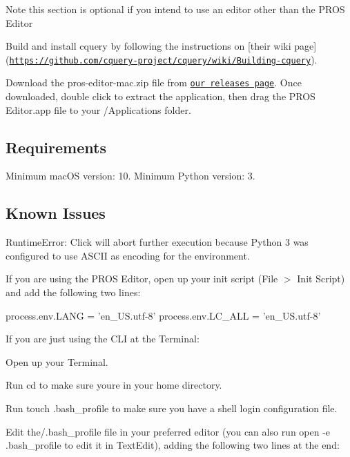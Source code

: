 \begin{DoxyNote}{Note}
this section is optional if you intend to use an editor other than the P\+R\+OS Editor
\end{DoxyNote}

\begin{DoxyEnumerate}
\item Build and install cquery by following the instructions on \mbox{[}their wiki page\mbox{]}(\href{https://github.com/cquery-project/cquery/wiki/Building-cquery}{\tt https\+://github.\+com/cquery-\/project/cquery/wiki/\+Building-\/cquery}).
\item Download the pros-\/editor-\/mac.\+zip file from \href{https://github.com/purduesigbots/atom/releases/latest}{\tt our releases page}. Once downloaded, double click to extract the application, then drag the P\+R\+OS Editor.\+app file to your /\+Applications folder.
\end{DoxyEnumerate}

\subsection*{Requirements}

Minimum mac\+OS version\+: 10. Minimum Python version\+: 3.

\subsection*{Known Issues}

Runtime\+Error\+: Click will abort further execution because Python 3 was configured to use A\+S\+C\+II as encoding for the environment.

If you are using the P\+R\+OS Editor, open up your init script (File $>$ Init Script) and add the following two lines\+:


\begin{DoxyCode}
process.env.LANG = 'en\_US.utf-8'
process.env.LC\_ALL = 'en\_US.utf-8'
\end{DoxyCode}


If you are just using the C\+LI at the Terminal\+:


\begin{DoxyEnumerate}
\item Open up your Terminal.
\item Run cd to make sure you\textquotesingle{}re in your home directory.
\item Run touch .bash\+\_\+profile to make sure you have a shell login configuration file.
\item Edit the/.bash\+\_\+profile file in your preferred editor (you can also run open -\/e .bash\+\_\+profile to edit it in Text\+Edit), adding the following two lines at the end\+:
\end{DoxyEnumerate}


